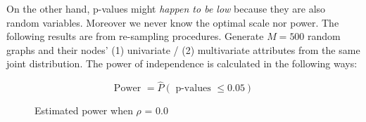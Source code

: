 \documentclass[12pt]{report}
\begin{document}
On the other hand, p-values might \textit{happen to be low} because they are also random variables. Moreover we never know the optimal scale nor power. The following results are from re-sampling procedures. Generate $M=500$ random graphs and their nodes' (1) univariate / (2) multivariate attributes from the same joint distribution. The power of independence is calculated in the following ways:


$$\mbox{Power } = \hat{P}(\mbox{ p-values } \leq 0.05)$$


\begin{figure}[H]
\captionsetup{format=plain}
\centering
{}
\caption{Estimated power when $\rho$ = 0.0}
\label{fig:power0}    
\end{figure} 
\end{document}
